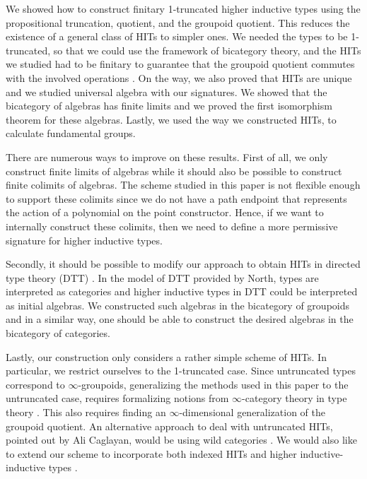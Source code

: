 We showed how to construct finitary 1-truncated higher inductive types using the propositional truncation, quotient, and the groupoid quotient.
This reduces the existence of a general class of HITs to simpler ones.
We needed the types to be 1-truncated, so that we could use the framework of bicategory theory,
and the HITs we studied had to be finitary to guarantee that the groupoid quotient
commutes with the involved operations \cite{DBLP:journals/mscs/ChapmanUV19}.
On the way, we also proved that HITs are unique and we studied universal algebra with our signatures.
We showed that the bicategory of algebras has finite limits and we proved the first isomorphism theorem for these algebras.
Lastly, we used the way we constructed HITs, to calculate fundamental groups.

There are numerous ways to improve on these results.
First of all, we only construct finite limits of algebras while it should also be possible to construct finite colimits of algebras.
The scheme studied in this paper is not flexible enough to support these colimits since we do not have a path endpoint that represents the action of a polynomial on the point constructor.
Hence, if we want to internally construct these colimits, then we need to define a more permissive signature for higher inductive types.

Secondly, it should be possible to modify our approach to obtain HITs in directed type theory (DTT) \cite{north2019towards}.
In the model of DTT provided by North, types are interpreted as categories and higher inductive types in DTT could be interpreted as initial algebras.
We constructed such algebras in the bicategory of groupoids and in a similar way, one should be able to construct the desired algebras in the bicategory of categories.

Lastly, our construction only considers a rather simple scheme of HITs.
In particular, we restrict ourselves to the 1-truncated case. %
Since untruncated types correspond to $\infty$-groupoids,
generalizing the methods used in this paper to the untruncated case,
requires formalizing notions from $\infty$-category theory in type theory
\cite{DBLP:conf/csl/AltenkirchR12,DBLP:journals/pacmpl/CapriottiK18,FinsterM17}.
This also requires finding an $\infty$-dimensional generalization of the groupoid quotient.
An alternative approach to deal with untruncated HITs, pointed out by Ali Caglayan,
would be using wild categories \cite{DBLP:conf/tlca/HirschowitzHT15,KrausRaumer}.
We would also like to extend our scheme to incorporate both indexed HITs and higher inductive-inductive types \cite{CavalloH19,KaposiK18}.
